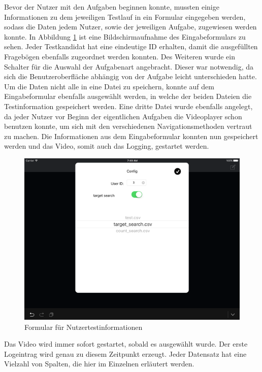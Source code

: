 \documentclass[11pt,a4paper]{report}
\begin{document}
Bevor der Nutzer mit den Aufgaben beginnen konnte, mussten einige Informationen zu dem jeweiligen Testlauf in ein Formular eingegeben werden, sodass die Daten jedem Nutzer, sowie der jeweiligen Aufgabe, zugewiesen werden konnte. In Abbildung \ref{formular_logging} ist eine Bildschirmaufnahme des Eingabeformulars zu sehen. Jeder Testkandidat hat eine eindeutige ID erhalten, damit die ausgefüllten Fragebögen ebenfalls zugeordnet werden konnten. Des Weiteren wurde ein Schalter für die Auswahl der Aufgabenart angebracht. Dieser war notwendig, da sich die Benutzeroberfläche abhängig von der Aufgabe leicht unterschieden hatte. Um die Daten nicht alle in eine Datei zu speichern, konnte auf dem Eingabeformular ebenfalls ausgewählt werden, in welche der beiden Dateien die Testinformation gespeichert werden. Eine dritte Datei wurde ebenfalls angelegt, da jeder Nutzer vor Beginn der eigentlichen Aufgaben die Videoplayer schon benutzen konnte, um sich mit den verschiedenen Navigationsmethoden vertraut zu machen. Die Informationen aus dem Eingabeformular konnten nun gespeichert werden und das Video, somit auch das Logging, gestartet werden.
\begin{figure}[h]
\begin{center}
\includegraphics[scale=1.2]{./images/30.png}
\caption{Formular für Nutzertestinformationen}
\label{formular_logging}
\end{center}
\end{figure}
Das Video wird immer sofort gestartet, sobald es ausgewählt wurde. Der erste Logeintrag wird genau zu diesem Zeitpunkt erzeugt. Jeder Datensatz hat eine Vielzahl von Spalten, die hier im Einzelnen erläutert werden.
\end{document}
